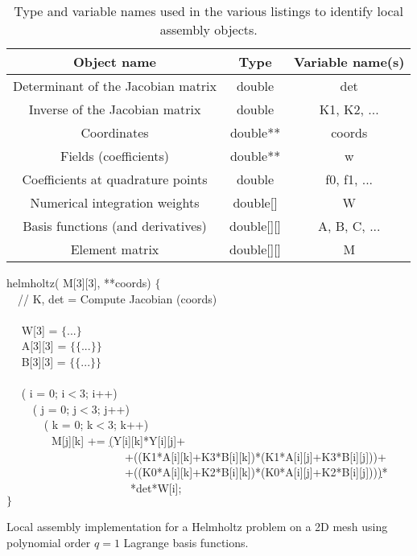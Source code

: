 \begin{table}
\scriptsize
\begin{center}
\begin{tabulary}{1.0\columnwidth}{C|C|C}
\hline
Object name & Type & Variable name(s) \\\hline
Determinant of the Jacobian matrix & double & det  \\
Inverse of the Jacobian matrix & double & K1, K2, ... \\
Coordinates & double** & coords\\
Fields (coefficients) & double** & w \\
Coefficients at quadrature points & double & f0, f1, ...\\
Numerical integration weights & double[] & W \\
Basis functions (and derivatives) & double[][] & A, B, C, ... \\
Element matrix & double[][] & M\\ \hline
\end{tabulary}
\end{center}
\caption{Type and variable names used in the various listings to identify local assembly objects.}
\label{table:map-name-letters}
\end{table}


\begin{algorithm}[t]
\scriptsize
{}

 helmholtz( M[3][3],  **coords) $\lbrace$\\
~~// K, det = Compute Jacobian (coords) \\
~~\\
~~ W[3] = $\lbrace$...$\rbrace$\\
~~ A[3][3] = $\lbrace\lbrace$...$\rbrace\rbrace$\\
~~ B[3][3] = $\lbrace\lbrace$...$\rbrace\rbrace$\\
~~\\
~~ ( i = 0; i$<$3; i++) \\
~~~~ ( j = 0; j$<$3; j++) \\
~~~~~~ ( k = 0; k$<$3; k++) \\
~~~~~~~~M[j][k] += \underline{(}Y[i][k]*Y[i][j]+\\
~~~~~~~~~~~~~~~~~~~~~+((K1*A[i][k]+K3*B[i][k])*(K1*A[i][j]+K3*B[i][j]))+\\
~~~~~~~~~~~~~~~~~~~~~+((K0*A[i][k]+K2*B[i][k])*(K0*A[i][j]+K2*B[i][j]))\underline{)}*\\
~~~~~~~~~~~~~~~~~~~~~~*det*W[i];\\
$\rbrace$
\caption{Local assembly implementation for a Helmholtz problem on a 2D mesh using polynomial order $q=1$ Lagrange basis functions.}
\label{code:helmholtz}
\end{algorithm}


